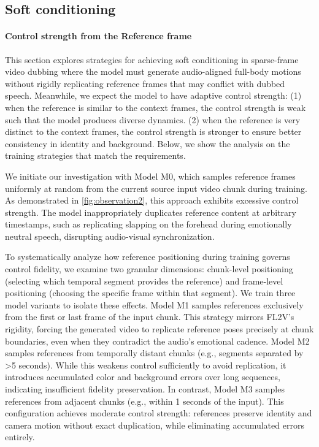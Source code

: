 \subsection{Soft conditioning}
\label{sec:strategies}
\paragraph{Control strength from the Reference frame}
This section explores strategies for achieving soft conditioning in sparse-frame video dubbing where the model must generate audio-aligned full-body motions without rigidly replicating reference frames that may conflict with dubbed speech. Meanwhile, we expect the model to have adaptive control strength: (1) when the reference is similar to the context frames, the control strength is weak such that the model produces diverse dynamics. (2) when the reference is very distinct to the context frames, the control strength is stronger to ensure better consistency in identity and background. Below, we show the analysis on the training strategies that match the requirements.

We initiate our investigation with Model M0, which samples reference frames uniformly at random from the current source input video chunk during training. As demonstrated in \cref{fig:observation2}, this approach exhibits excessive control strength. The model inappropriately duplicates reference content at arbitrary timestamps, such as replicating slapping on the forehead during emotionally neutral speech, disrupting audio-visual synchronization.

To systematically analyze how reference positioning during training governs control fidelity, we examine two granular dimensions: chunk-level positioning (selecting which temporal segment provides the reference) and frame-level positioning (choosing the specific frame within that segment). We train three model variants to isolate these effects. Model M1 samples references exclusively from the first or last frame of the input chunk. This strategy mirrors FL2V's rigidity, forcing the generated video to replicate reference poses precisely at chunk boundaries, even when they contradict the audio's emotional cadence. Model M2 samples references from temporally distant chunks (e.g., segments separated by >5 seconds). While this weakens control sufficiently to avoid replication, it introduces accumulated color and background errors over long sequences, indicating insufficient fidelity preservation. In contrast, Model M3 samples references from adjacent chunks (e.g., within 1 seconds of the input). This configuration achieves moderate control strength: references preserve identity and camera motion without exact duplication, while eliminating accumulated errors entirely.

